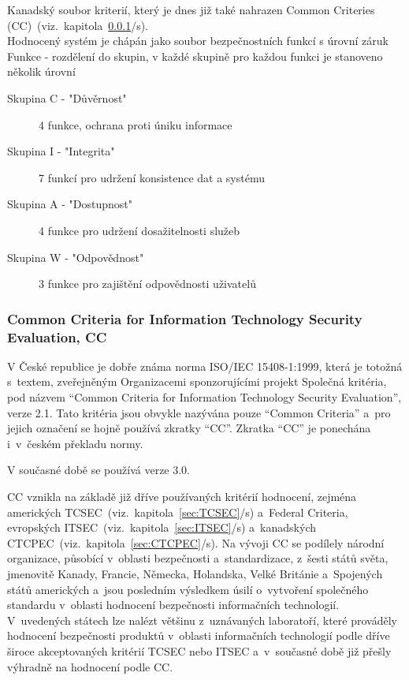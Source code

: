 \documentclass[a4paper,12pt]{article}
\newcommand{\odkazNaKapitolu}[1]{(viz.~kapitola~\ref{#1}/s\pageref{#1})}
\begin{document}
Kanadský soubor kriterií, který je dnes již také nahrazen Common Criteries (CC)~\odkazNaKapitolu{sec:cc}.\\

Hodnocený systém je chápán jako soubor bezpečnostních funkcí s úrovní záruk~\cite{PrezentaceBIS}\\

Funkce - rozdělení do skupin, v každé skupině pro každou funkci je stanoveno několik úrovní~\cite{PrezentaceBIS}
\begin{description}
 \item[Skupina C - "Důvěrnost"] 4 funkce, ochrana proti úniku informace 
 \item[Skupina I - "Integrita"] 7 funkcí pro udržení konsistence dat a systému 
 \item[Skupina A - "Dostupnost"] 4 funkce pro udržení dosažitelnosti služeb 
 \item[Skupina W - "Odpovědnost"] 3 funkce pro zajištění odpovědnosti uživatelů 
\end{description}

\subsubsection[Common Criteria, CC]{Common Criteria for Information Technology Security Evaluation, CC}\label{sec:cc}

V České republice je dobře známa norma ISO/IEC 15408-1:1999, která je totožná s~textem, zveřejněným Organizacemi sponzorujícími projekt Společná kritéria, pod názvem “Common Criteria for Information Technology Security Evaluation”, verze 2.1. Tato kritéria jsou obvykle nazývána pouze “Common Criteria” a~pro jejich označení se hojně používá zkratky “CC”. Zkratka “CC”
je ponechána i~v~českém překladu normy.~\cite{NBUHodnoceniBezpecnostiSW}

V současné době se používá verze 3.0.

CC vznikla na základě již dříve používaných kritérií hodnocení, zejména amerických TCSEC~\odkazNaKapitolu{sec:TCSEC} a~Federal Criteria, evropských ITSEC~\odkazNaKapitolu{sec:ITSEC} a~kanadských CTCPEC~\odkazNaKapitolu{sec:CTCPEC}. Na vývoji CC se podílely národní organizace, působící v~oblasti bezpečnosti a~standardizace, z~šesti států světa, jmenovitě Kanady, Francie, Německa, Holandska, Velké Británie a~Spojených států amerických a~jsou posledním výsledkem úsilí o~vytvoření společného standardu v~oblasti hodnocení bezpečnosti informačních technologií. V~uvedených státech lze nalézt většinu z~uznávaných laboratoří, které prováděly hodnocení bezpečnosti produktů v~oblasti informačních technologií podle dříve široce akceptovaných kritérií TCSEC nebo ITSEC a~v~současné době již přešly výhradně na hodnocení podle CC.~\cite{NBUHodnoceniBezpecnostiSW}
\end{document}
